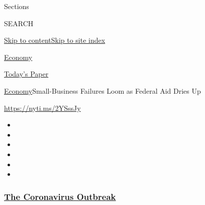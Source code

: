Sections

SEARCH

\protect\hyperlink{site-content}{Skip to
content}\protect\hyperlink{site-index}{Skip to site index}

\href{https://www.nytimes3xbfgragh.onion/section/business/economy}{Economy}

\href{https://myaccount.nytimes3xbfgragh.onion/auth/login?response_type=cookie\&client_id=vi}{}

\href{https://www.nytimes3xbfgragh.onion/section/todayspaper}{Today's
Paper}

\href{/section/business/economy}{Economy}\textbar{}Small-Business
Failures Loom as Federal Aid Dries Up

\url{https://nyti.ms/2YSssJy}

\begin{itemize}
\item
\item
\item
\item
\item
\item
\end{itemize}

\hypertarget{the-coronavirus-outbreak}{%
\subsubsection{\texorpdfstring{\href{https://www.nytimes3xbfgragh.onion/news-event/coronavirus?name=styln-coronavirus-markets\&region=TOP_BANNER\&block=storyline_menu_recirc\&action=click\&pgtype=Article\&impression_id=bad28bd0-f52f-11ea-ae45-8f05135d08e7\&variant=undefined}{The
Coronavirus
Outbreak}}{The Coronavirus Outbreak}}\label{the-coronavirus-outbreak}}

